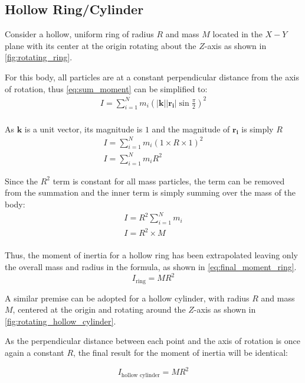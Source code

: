\subsection{Hollow Ring/Cylinder}

Consider a hollow, uniform ring of radius $R$ and mass $M$ located in the $X-Y$ plane with its center at the origin rotating about the $Z$-axis as shown in \cref{fig:rotating_ring}.



For this body, all particles are at a constant perpendicular distance from the axis of rotation, thus \cref{eq:sum_moment} can be simplified to:
\begin{gather*}
I = \sum_{i=1}^N m_i (|\bm{k}||\bm{r_i}| \sin{\frac{\pi}{2}})^2\\
\end{gather*}

As $\bm{k}$ is a unit vector, its magnitude is $1$ and the magnitude of $\bm{r_i}$ is simply $R$  \begin{gather*}  
I = \sum_{i=1}^N m_i (1 \times R \times 1)^2 \\
I = \sum_{i=1}^N m_i R^2
\end{gather*}

Since the $R^2$ term is constant for all mass particles, the term can be removed from the summation and the inner term is simply summing over the mass of the body:
\begin{align*}
I = R^2\sum_{i=1}^N m_i \\
I = R^2 \times M \\
\end{align*}

Thus, the moment of inertia for a hollow ring has been extrapolated leaving only the overall mass and radius in the formula, as shown in \cref{eq:final_moment_ring}.
\begin{equation}
I_{\text{ring}} = MR^2
\label{eq:final_moment_ring}
\end{equation}

A similar premise can be adopted for a hollow cylinder, with radius $R$ and mass $M$, centered at the origin and rotating around the $Z$-axis as shown in \cref{fig:rotating_hollow_cylinder}.



As the perpendicular distance between each point and the axis of rotation is once again a constant $R$, the final result for the moment of inertia will be identical:

\begin{equation}
I_{\text{hollow cylinder}} = MR^2
\label{eq:final_moment_hollow_cylinder}
\end{equation}